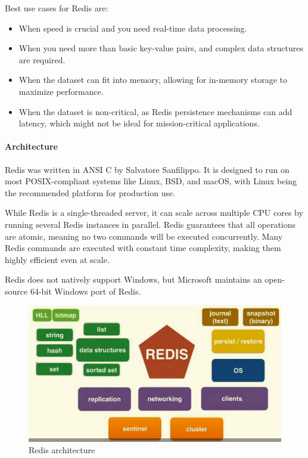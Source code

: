 Best use cases for Redis are: 
\begin{itemize} 
    \item When speed is crucial and you need real-time data processing. 
    \item When you need more than basic key-value pairs, and complex data structures are required. 
    \item When the dataset can fit into memory, allowing for in-memory storage to maximize performance.
     \item When the dataset is non-critical, as Redis persistence mechanisms can add latency, which might not be ideal for mission-critical applications. 
\end{itemize}

\paragraph*{Architecture}
Redis was written in ANSI C by Salvatore Sanfilippo. 
It is designed to run on most POSIX-compliant systems like Linux, BSD, and macOS, with Linux being the recommended platform for production use.

While Redis is a single-threaded server, it can scale across multiple CPU cores by running several Redis instances in parallel. 
Redis guarantees that all operations are atomic, meaning no two commands will be executed concurrently.
Many Redis commands are executed with constant time complexity, making them highly efficient even at scale. 

Redis does not natively support Windows, but Microsoft maintains an open-source 64-bit Windows port of Redis.
\begin{figure}[H]
    \centering
    \includegraphics[width=0.75\linewidth]{images/redis.png}
    \caption{Redis architecture}
\end{figure}
